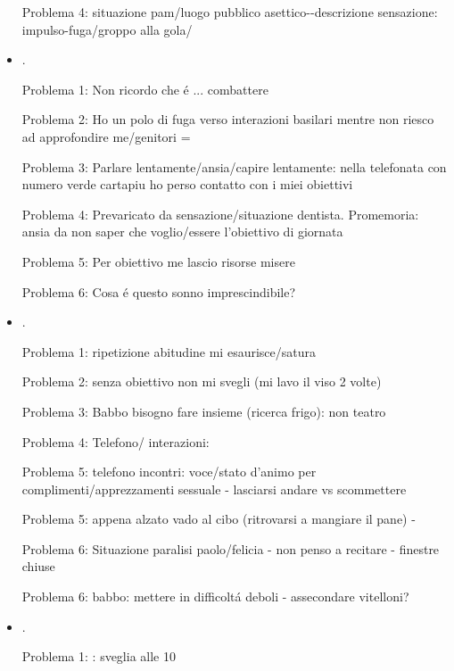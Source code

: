 \begin{itemize}
Problema 4: situazione pam/luogo pubblico asettico--descrizione sensazione: impulso-fuga/groppo alla gola/


\item {}.

Problema 1: Non ricordo che \'e ... combattere

Problema 2: Ho un polo di fuga verso interazioni basilari mentre non riesco ad approfondire me/genitori = 

Problema 3: Parlare lentamente/ansia/capire lentamente: nella telefonata con numero verde cartapiu ho perso contatto con i miei obiettivi

Problema 4: Prevaricato da sensazione/situazione dentista. Promemoria: ansia da non saper che voglio/essere l'obiettivo di giornata

Problema 5: Per obiettivo me lascio risorse misere

Problema 6: Cosa \'e questo sonno imprescindibile?


\item {}.

Problema 1: ripetizione abitudine mi esaurisce/satura

Problema 2: senza obiettivo non mi svegli (mi lavo il viso 2 volte)

Problema 3: Babbo bisogno fare insieme (ricerca frigo): non teatro

Problema 4: Telefono/ interazioni: 

Problema 5: telefono incontri: voce/stato d'animo per complimenti/apprezzamenti sessuale - lasciarsi andare vs scommettere

Problema 5: appena alzato vado al cibo (ritrovarsi a mangiare il pane) - 

Problema 6: Situazione paralisi paolo/felicia - non penso a recitare - finestre chiuse 

Problema 6: babbo: mettere in difficolt\'a deboli - assecondare vitelloni?

\item {}.

Problema 1: : sveglia alle 10


\end{itemize}
